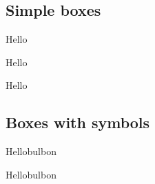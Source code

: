 \lipsum[1]

\subsection{Simple boxes}

\begin{tblslineshorizontal}{Hello}
\lipsum[2]
\lipsum[31]
\end{tblslineshorizontal}
\newpage
\begin{tblsfilled}{Hello}
\lipsum[2]
\lipsum[31]
\end{tblsfilled}

\begin{tblsframed}{Hello}
\lipsum[2]
\lipsum[31]
\end{tblsframed}

\subsection{Boxes with symbols}

\begin{tblsfilledsymbol}{Hello}{bulbon}
\lipsum[24-30]
\lipsum[31]
\end{tblsfilledsymbol}

\begin{tblsframedsymbol}{Hello}{bulbon}
\lipsum[24-30]
\lipsum[31]
\end{tblsframedsymbol}
